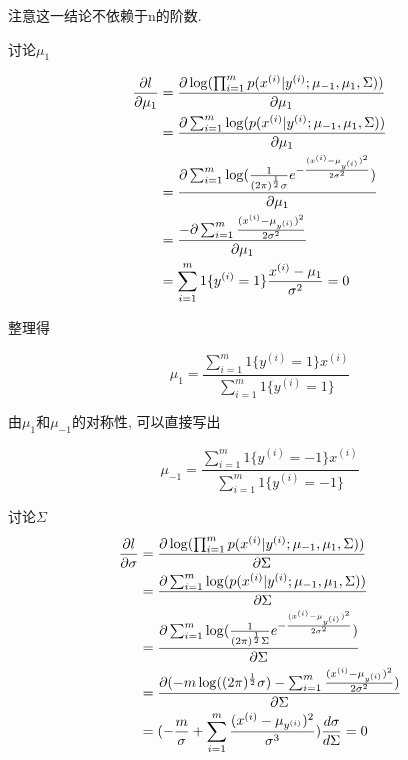 \documentclass{ctexart}
\begin{document}
注意这一结论不依赖于n的阶数.

讨论$\mu_1$

\begin{align*}
		\frac{\partial l}{\partial \mu_1} &= \frac{\partial \log(\prod_{i=1}^m p(x^{(i)}|y^{(i)};\mu_{-1},\mu_1,\Sigma))}{\partial \mu_1} \notag \\
		&=  \frac{\partial \sum_{i=1}^m\log( p(x^{(i)}|y^{(i)};\mu_{-1},\mu_1,\Sigma))}{\partial \mu_1} \notag \\
		&=  \frac{\partial \sum_{i=1}^m\log(\frac{1}{(2\pi)^{\frac{1}{2}}\sigma}e^{-\frac{(x^{(i)}-\mu_{y^{(i)}})^2}{2\sigma^2}})}{\partial \mu_1} \notag \\
		&=  \frac{-\partial \sum_{i=1}^m \frac{(x^{(i)} - \mu_{y^{(i)}})^2}{2 \sigma^2}}{\partial \mu_1} \notag \\
		&= \sum_{i = 1}^m 1\{y^{(i)} = 1\}\frac{x^{(i)} - \mu_1}{\sigma^2} = 0
\end{align*}

整理得

\begin{equation}
	\mu_{1} = \frac{\sum_{i=1}^m 1\{y^{(i)} = 1\} x^{(i)}}{\sum_{i=1}^m 1\{y^{(i)} = 1\}}
\end{equation}

由$\mu_1$和$\mu_{-1}$的对称性, 可以直接写出

\begin{equation}
\mu_{-1} = \frac{\sum_{i=1}^m 1\{y^{(i)} = -1\} x^{(i)}}{\sum_{i=1}^m 1\{y^{(i)} = -1\}}
\end{equation}

讨论$\Sigma$
\begin{align*}
\frac{\partial l}{\partial \sigma} &= \frac{\partial \log(\prod_{i=1}^m p(x^{(i)}|y^{(i)};\mu_{-1},\mu_1,\Sigma))}{\partial \Sigma} \notag \\
&=  \frac{\partial \sum_{i=1}^m\log( p(x^{(i)}|y^{(i)};\mu_{-1},\mu_1,\Sigma))}{\partial \Sigma} \notag \\
&=  \frac{\partial \sum_{i=1}^m\log(\frac{1}{(2\pi)^{\frac{1}{2}}\Sigma}e^{-\frac{(x^{(i)}-\mu_{y^{(i)}})^2}{2\sigma^2}})}{\partial \Sigma} \notag \\
&=  \frac{ \partial (-m\log((2\pi)^{\frac{1}{2}}\sigma) -\sum_{i=1}^m \frac{(x^{(i)} - \mu_{y^{(i)}})^2}{2 \sigma^2})}{\partial \Sigma} \notag \\
&= (-\frac{m}{\sigma} + \sum_{i=1}^m\frac{(x^{(i)} -\mu_{y^{(i)}})^2}{\sigma^3})\frac{d \sigma}{d \Sigma} = 0
\end{align*}
\end{document}
